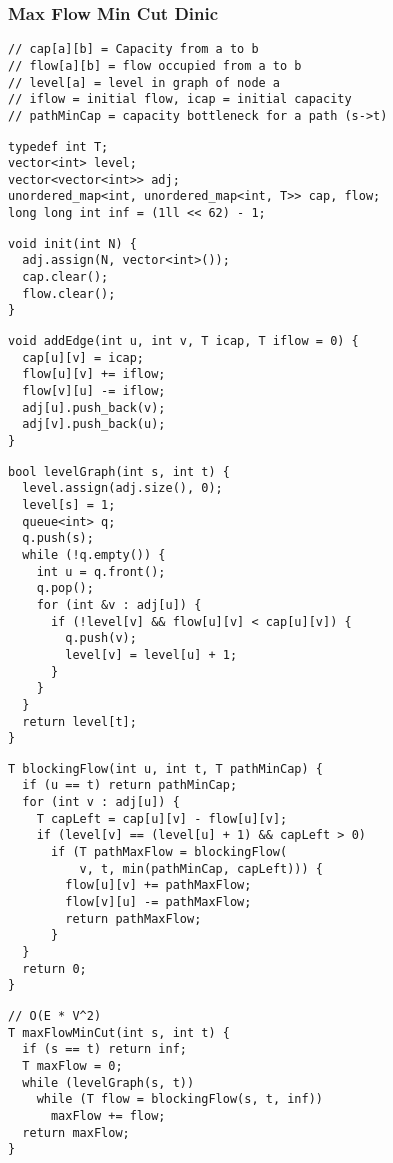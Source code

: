 \documentclass[twoside]{article}
\begin{document}
\begin{multicols*}{2}
\subsubsection*{Max Flow Min Cut Dinic}
\begin{verbatim}
// cap[a][b] = Capacity from a to b
// flow[a][b] = flow occupied from a to b
// level[a] = level in graph of node a
// iflow = initial flow, icap = initial capacity
// pathMinCap = capacity bottleneck for a path (s->t)
\end{verbatim}
\vspace{-12pt}
\begin{verbatim}
typedef int T;
vector<int> level;
vector<vector<int>> adj;
unordered_map<int, unordered_map<int, T>> cap, flow;
long long int inf = (1ll << 62) - 1;
\end{verbatim}
\vspace{-12pt}
\begin{verbatim}
void init(int N) {
  adj.assign(N, vector<int>());
  cap.clear();
  flow.clear();
}
\end{verbatim}
\vspace{-12pt}
\begin{verbatim}
void addEdge(int u, int v, T icap, T iflow = 0) {
  cap[u][v] = icap;
  flow[u][v] += iflow;
  flow[v][u] -= iflow;
  adj[u].push_back(v);
  adj[v].push_back(u);
}
\end{verbatim}
\vspace{-12pt}
\begin{verbatim}
bool levelGraph(int s, int t) {
  level.assign(adj.size(), 0);
  level[s] = 1;
  queue<int> q;
  q.push(s);
  while (!q.empty()) {
    int u = q.front();
    q.pop();
    for (int &v : adj[u]) {
      if (!level[v] && flow[u][v] < cap[u][v]) {
        q.push(v);
        level[v] = level[u] + 1;
      }
    }
  }
  return level[t];
}
\end{verbatim}
\vspace{-12pt}
\begin{verbatim}
T blockingFlow(int u, int t, T pathMinCap) {
  if (u == t) return pathMinCap;
  for (int v : adj[u]) {
    T capLeft = cap[u][v] - flow[u][v];
    if (level[v] == (level[u] + 1) && capLeft > 0)
      if (T pathMaxFlow = blockingFlow(
          v, t, min(pathMinCap, capLeft))) {
        flow[u][v] += pathMaxFlow;
        flow[v][u] -= pathMaxFlow;
        return pathMaxFlow;
      }
  }
  return 0;
}
\end{verbatim}
\vspace{-12pt}
\begin{verbatim}
// O(E * V^2)
T maxFlowMinCut(int s, int t) {
  if (s == t) return inf;
  T maxFlow = 0;
  while (levelGraph(s, t))
    while (T flow = blockingFlow(s, t, inf))
      maxFlow += flow;
  return maxFlow;
}
\end{verbatim}


\end{multicols*}
\end{document}
